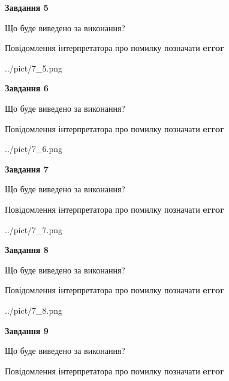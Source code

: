 \documentclass[11pt, ukrainian]{article}
\begin{document}
{\begin {large}
{\begin {center}\textbf{Завдання 5}\end {center}}\par
Що буде виведено за виконання? \par
Повідомлення інтерпретатора про помилку позначати \textbf{error}

\begin{center}
	{../pict/7_5.png}
\end{center}
\newpage

{\begin {center}\textbf{Завдання 6}\end {center}}\par
Що буде виведено за виконання? \par
Повідомлення інтерпретатора про помилку позначати \textbf{error}

\begin{center}
	{../pict/7_6.png}
\end{center}
\newpage

{\begin {center}\textbf{Завдання 7}\end {center}}\par
Що буде виведено за виконання? \par
Повідомлення інтерпретатора про помилку позначати \textbf{error}

\begin{center}
	{../pict/7_7.png}
\end{center}
\newpage

{\begin {center}\textbf{Завдання 8}\end {center}}\par
Що буде виведено за виконання? \par
Повідомлення інтерпретатора про помилку позначати \textbf{error}

\begin{center}
	{../pict/7_8.png}
\end{center}
\newpage

{\begin {center}\textbf{Завдання 9}\end {center}}\par
Що буде виведено за виконання? \par
Повідомлення інтерпретатора про помилку позначати \textbf{error}


\end{large}}
\end{document}
